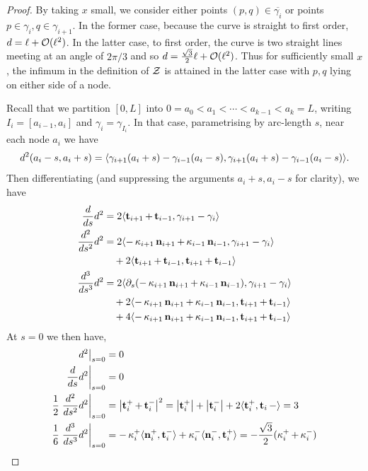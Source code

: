 \documentclass[12pt]{amsart}
\begin{document}
\begin{proof}
By taking $x$ small, we consider either points $(p,q) \in \overline{\gamma_i}$ or points $p \in \gamma_i, q \in \gamma_{i+1}$. In the former case, because the curve is straight to first order, $d = \ell + \operatorname{\mathcal{O}}(\ell^2)$. In the latter case, to first order, the curve is two straight lines meeting at an angle of $2\pi/3$ and so $d = \tfrac{\sqrt{3}}{2} \ell + \operatorname{\mathcal{O}}(\ell^2)$. Thus for sufficiently small $x$, the infimum in the definition of $\operatorname{\mathcal{Z}}$ is attained in the latter case with $p,q$ lying on either side of a node.

Recall that we partition \([0, L]\) into \(0 = a_0 < a_1 < \cdots < a_{k-1} < a_k = L\), writing \(I_i = [a_{i-1}, a_i]\) and \(\gamma_i = \gamma_{I_i}\). In that case, parametrising by arc-length $s$, near each node $a_i$ we have
\[
d^2(a_i - s, a_i + s) = \langle{\gamma_{i+1}(a_i + s) - \gamma_{i-1}(a_i - s)},{\gamma_{i+1}(a_i + s) - \gamma_{i-1}(a_i - s)}\rangle.
\]
Then differentiating (and suppressing the arguments \(a_i + s, a_i - s\) for clarity), we have
\begin{align*}
\frac{d}{ds} d^2 &= 2 \langle{\operatorname{\mathbf{t}}_{i+1} + \operatorname{\mathbf{t}}_{i-1}},{\gamma_{i+1} - \gamma_i}\rangle \\
\frac{d^2}{ds^2} d^2 &= 2 \langle{-\operatorname{\kappa}_{i+1} \operatorname{\mathbf{n}}_{i+1} + \operatorname{\kappa}_{i-1} \operatorname{\mathbf{n}}_{i-1}},{\gamma_{i+1} - \gamma_i}\rangle \\
&\quad + 2 \langle{\operatorname{\mathbf{t}}_{i+1} + \operatorname{\mathbf{t}}_{i-1}},{\operatorname{\mathbf{t}}_{i+1} + \operatorname{\mathbf{t}}_{i-1}}\rangle \\
\frac{d^3}{ds^3} d^2 &= 2 \langle{\partial_s(-\operatorname{\kappa}_{i+1} \operatorname{\mathbf{n}}_{i+1}  + \operatorname{\kappa}_{i-1} \operatorname{\mathbf{n}}_{i-1} )},{\gamma_{i+1}  - \gamma_i}\rangle \\
&\quad + 2 \langle{-\operatorname{\kappa}_{i+1} \operatorname{\mathbf{n}}_{i+1}  + \operatorname{\kappa}_{i-1} \operatorname{\mathbf{n}}_{i-1} },{\operatorname{\mathbf{t}}_{i+1} + \operatorname{\mathbf{t}}_{i-1}}\rangle \\
&\quad + 4 \langle{-\operatorname{\kappa}_{i+1} \operatorname{\mathbf{n}}_{i+1}  + \operatorname{\kappa}_{i-1} \operatorname{\mathbf{n}}_{i-1} },{\operatorname{\mathbf{t}}_{i+1} + \operatorname{\mathbf{t}}_{i-1}}\rangle
\end{align*}
At \(s = 0\) we then have,
\begin{align*}
\left. d^2 \right|_{s=0} &= 0 \\
\left.\frac{d}{ds} d^2\right|_{s=0} &= 0 \\
\frac{1}{2} \left.\frac{d^2}{ds^2} d^2 \right|_{s=0} &= \left|\operatorname{\mathbf{t}}_i^+ + \operatorname{\mathbf{t}}_i^-\right|^2 = \left|\operatorname{\mathbf{t}}_i^+\right| + \left|\operatorname{\mathbf{t}}_i^-\right| + 2\langle{\operatorname{\mathbf{t}}_i^+},{\operatorname{\mathbf{t}}_i-}\rangle = 3 \\
\frac{1}{6} \left.\frac{d^3}{ds^3} d^2 \right|_{s=0} &= -\operatorname{\kappa}_i^+ \langle{\operatorname{\mathbf{n}}_i^+},{\operatorname{\mathbf{t}}_i^-}\rangle + \operatorname{\kappa}_i^- \langle{\operatorname{\mathbf{n}}_i^-},{\operatorname{\mathbf{t}}_i^+}\rangle = -\frac{\sqrt{3}}{2} (\operatorname{\kappa}_i^+ + \operatorname{\kappa}_i^-) \\
\end{align*}


\end{proof}
\end{document}
